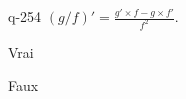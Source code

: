 \begin{truefalse}{q-254}
$(g / f)' = \frac{g'\times f - g\times f'}{f^2}$.
\item* Vrai
\item Faux
\end{truefalse}

